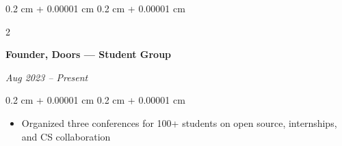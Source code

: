 \documentclass[10pt, letterpaper]{article}
\newenvironment{highlights}{
    \begin{itemize}[
        topsep=0.05 cm,
        parsep=0.05 cm,
        partopsep=0pt,
        itemsep=0pt,
        leftmargin=0.4 cm + 10pt
    ]
}{
    \end{itemize}
} %
\newenvironment{onecolentry}{
    \begin{adjustwidth}{
        0.2 cm + 0.00001 cm
    }{
        0.2 cm + 0.00001 cm
    }
}{
    \end{adjustwidth}
} %
\newenvironment{twocolentry}[2][]{
    \onecolentry
    \def\secondColumn{#2}
    \setcolumnwidth{\fill, 4.5 cm}
    \begin{paracol}{2}
}{
    \switchcolumn \raggedleft \secondColumn
    \end{paracol}
    \endonecolentry
} %
\begin{document}
        \vspace{0.12 cm}
        \begin{twocolentry}{
        \textit{Aug 2023 – Present}}
            \textbf{Founder, Doors — Student Group}
        \end{twocolentry}
        \vspace{0.10 cm}
        \begin{onecolentry}
            \begin{highlights}
                \item Organized three conferences for 100+ students on open source, internships, and CS collaboration
            \end{highlights}
        \end{onecolentry}
\end{document}
